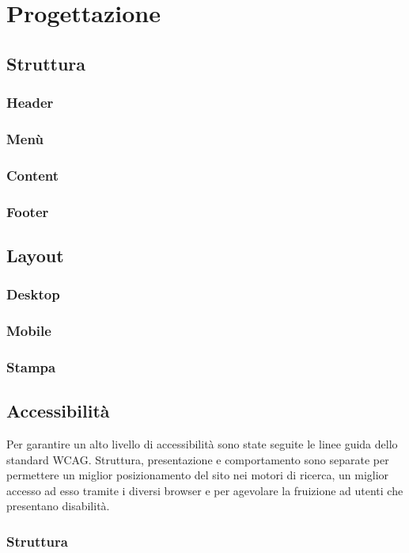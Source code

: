 \documentclass[12pt,a4paper,headings=optiontohead]{scrbook}
\begin{document}
\section{Progettazione}
\subsection{Struttura}
\subsubsection{Header}
\subsubsection{Menù}
\subsubsection{Content}
\subsubsection{Footer}

\subsection{Layout}
\subsubsection{Desktop}
\subsubsection{Mobile}
\subsubsection{Stampa}

\subsection{Accessibilità}
Per garantire un alto livello di accessibilità sono state seguite le linee guida dello standard WCAG. Struttura, presentazione e comportamento sono separate per permettere un miglior posizionamento del sito nei motori di ricerca, un miglior accesso ad esso tramite i diversi browser e per agevolare la fruizione ad utenti che presentano disabilità.
\subsubsection{Struttura}
\end{document}
